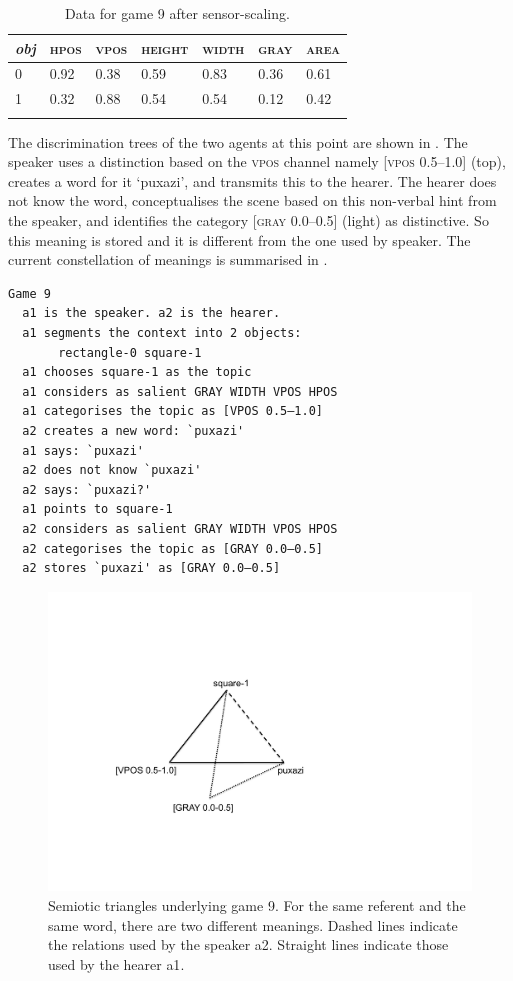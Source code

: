 \begin{table}
\begin{center}
\begin{tabular}{ l  l  l  l  l  l  l }
\lsptoprule
{\itshape obj} & \textsc{hpos} & \textsc{vpos} & \textsc{height} & \textsc{width} & \textsc{gray} & \textsc{area} \\ \midrule
0 & 0.92 & 0.38 & 0.59 & 0.83 & 0.36 & 0.61\\ 
1 & 0.32 & 0.88 & 0.54 & 0.54 & 0.12 & 0.42\\ 
\lspbottomrule
\end{tabular}
\caption{\label{tab:different}Data for game 9 after sensor-scaling.}
\end{center}
\end{table}
The discrimination trees of the two agents at this point
are shown in . 
The speaker uses a distinction based on the 
\textsc{vpos} channel namely [\textsc{vpos} 0.5–1.0] (top), creates
a word for it `puxazi', and transmits this to the hearer. 
The hearer does not know the word,
conceptualises the scene based on this non-verbal
hint from the speaker, and identifies the category
{}[\textsc{gray} 0.0–0.5] (light) as distinctive. So this 
meaning is stored and it is different from the one used by 
speaker. The current constellation of meanings
is summarised in . 
\begin{verbatim}
Game 9
  a1 is the speaker. a2 is the hearer. 
  a1 segments the context into 2 objects: 
       rectangle-0 square-1 
  a1 chooses square-1 as the topic 
  a1 considers as salient GRAY WIDTH VPOS HPOS 
  a1 categorises the topic as [VPOS 0.5–1.0]
  a2 creates a new word: `puxazi'
  a1 says: `puxazi'
  a2 does not know `puxazi'
  a2 says: `puxazi?'
  a1 points to square-1
  a2 considers as salient GRAY WIDTH VPOS HPOS
  a2 categorises the topic as [GRAY 0.0–0.5]
  a2 stores `puxazi' as [GRAY 0.0–0.5]
\end{verbatim}


\begin{figure}[htbp]
  \centerline{\includegraphics[width=.45\textwidth]{chap6/figs/triangle4.pdf}}
\caption{\label{triangle4}Semiotic triangles
underlying game 9. For the same referent and the same word, 
there are two different meanings. Dashed lines indicate
the relations used by the speaker {\bfshape  a2}. Straight lines
indicate those used by the hearer {\bfshape  a1}.}
\end{figure}

